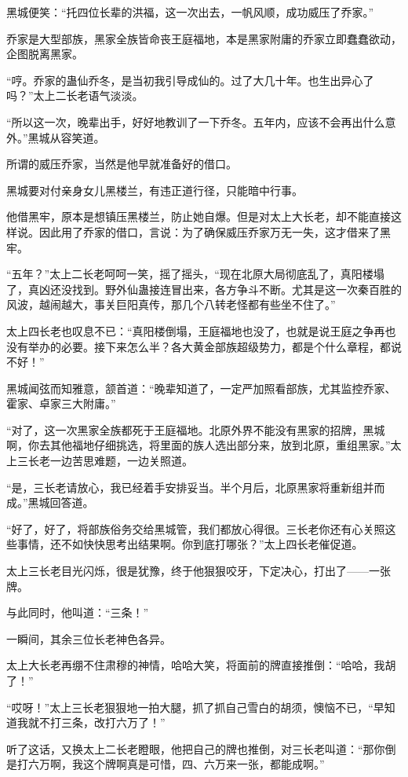 \begin{this_body}
黑城便笑：“托四位长辈的洪福，这一次出去，一帆风顺，成功威压了乔家。”

乔家是大型部族，黑家全族皆命丧王庭福地，本是黑家附庸的乔家立即蠢蠢欲动，企图脱离黑家。

“哼。乔家的蛊仙乔冬，是当初我引导成仙的。过了大几十年。也生出异心了吗？”太上二长老语气淡淡。

“所以这一次，晚辈出手，好好地教训了一下乔冬。五年内，应该不会再出什么意外。”黑城从容笑道。

所谓的威压乔家，当然是他早就准备好的借口。

黑城要对付亲身女儿黑楼兰，有违正道行径，只能暗中行事。

他借黑牢，原本是想镇压黑楼兰，防止她自爆。但是对太上大长老，却不能直接这样说。因此用了乔家的借口，言说：为了确保威压乔家万无一失，这才借来了黑牢。

“五年？”太上二长老呵呵一笑，摇了摇头，“现在北原大局彻底乱了，真阳楼塌了，真凶还没找到。野外仙蛊接连冒出来，各方争斗不断。尤其是这一次秦百胜的风波，越闹越大，事关巨阳真传，那几个八转老怪都有些坐不住了。”

太上四长老也叹息不已：“真阳楼倒塌，王庭福地也没了，也就是说王庭之争再也没有举办的必要。接下来怎么半？各大黄金部族超级势力，都是个什么章程，都说不好！”

黑城闻弦而知雅意，颔首道：“晚辈知道了，一定严加照看部族，尤其监控乔家、霍家、卓家三大附庸。”

“对了，这一次黑家全族都死于王庭福地。北原外界不能没有黑家的招牌，黑城啊，你去其他福地仔细挑选，将里面的族人选出部分来，放到北原，重组黑家。”太上三长老一边苦思难题，一边关照道。

“是，三长老请放心，我已经着手安排妥当。半个月后，北原黑家将重新组并而成。”黑城回答道。

“好了，好了，将部族俗务交给黑城管，我们都放心得很。三长老你还有心关照这些事情，还不如快快思考出结果啊。你到底打哪张？”太上四长老催促道。

太上三长老目光闪烁，很是犹豫，终于他狠狠咬牙，下定决心，打出了——一张牌。

与此同时，他叫道：“三条！”

一瞬间，其余三位长老神色各异。

太上大长老再绷不住肃穆的神情，哈哈大笑，将面前的牌直接推倒：“哈哈，我胡了！”

“哎呀！”太上三长老狠狠地一拍大腿，抓了抓自己雪白的胡须，懊恼不已，“早知道我就不打三条，改打六万了！”

听了这话，又换太上二长老瞪眼，他把自己的牌也推倒，对三长老叫道：“那你倒是打六万啊，我这个牌啊真是可惜，四、六万来一张，都能成啊。”


\end{this_body}

